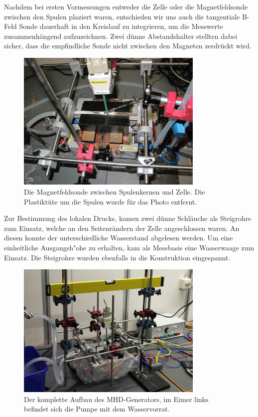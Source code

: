 \documentclass[11pt]{scrartcl}
\begin{document}
Nachdem bei ersten Vormessungen entweder die Zelle oder die Magnetfeldsonde zwischen den  Spulen plaziert waren, entschieden wir uns auch die tangentiale B-Feld Sonde dauerhaft in den Kreislauf zu integrieren, um die Messwerte zusammenh\"angend aufzuzeichnen. Zwei d\"unne Abstandshalter stellten dabei sicher, dass die empfindliche Sonde nicht zwischen den Magneten zerdr\"uckt wird.

\begin{figure}[ht]
\begin{center}
\includegraphics[width=0.8\textwidth]{images/offen.jpg}
\end{center}
\vspace{-1.5\baselineskip}
\caption{Die Magnetfeldsonde zwischen Spulenkernen und Zelle. Die Plastikt\"ute um die Spulen wurde für das Photo entfernt.}
\label{offen}
\end{figure}

Zur Bestimmung des lokalen Drucks, kamen zwei d\"unne Schl\"auche als Steigrohre zum Einsatz, welche an den Seitenr\"andern der Zelle angeschlossen waren. An diesen konnte der unterschiedliche Wasserstand abgelesen werden. Um eine einheitliche Ausgangsh"ohe zu erhalten, kam als Messbasis eine Wasserwaage zum Einsatz. Die Steigrohre wurden ebenfalls in die Konstruktion eingespannt.

\begin{figure}[ht]
\begin{center}
\includegraphics[width=0.8\textwidth]{images/wwaage.jpg}
\end{center}
\vspace{-1.5\baselineskip}
\caption{Der komplette Aufbau des MHD-Generators, im Eimer links befindet sich die Pumpe mit dem Wasservorrat.}
\label{wwaage}
\end{figure}
\end{document}
